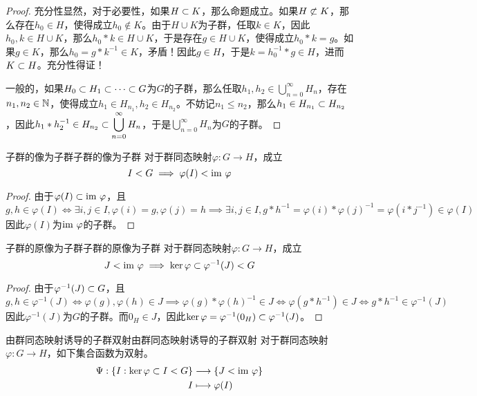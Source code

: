 \begin{proof}
	充分性显然，对于必要性，如果$H\subset K$，那么命题成立。如果$H\not\subset K$，那么存在$h_0\in H$，使得成立$h_0\notin K$。由于$H\cup K$为子群，任取$k\in K$，因此$h_0,k\in H\cup K$，那么$h_0*k\in H\cup K$，于是存在$g\in H\cup K$，使得成立$h_0*k=g$。如果$g\in K$，那么$h_0=g*k^{-1}\in K$，矛盾！因此$g\in H$，于是$k=h_0^{-1}*g\in H$，进而$K\subset H$。充分性得证！
	
	一般的，如果$H_0\subset H_1\subset\cdots\subset G$为$G$的子群，那么任取$h_1,h_2\in \displaystyle\bigcup_{n=0}^{\infty}H_n$，存在$n_1,n_2\in\mathbb{N}$，使得成立$h_1\in H_{n_1},h_2\in H_{n_2}$。不妨记$n_1\le n_2$，那么$h_1\in H_{n_1}\subset H_{n_2}$，因此$h_1*h_2^{-1}\in H_{n_2}\subset\displaystyle\bigcup_{n=0}^{\infty}H_n$，于是$\displaystyle\bigcup_{n=0}^{\infty}H_n$为$G$的子群。
\end{proof}

\begin{proposition}{子群的像为子群}{子群的像为子群}
	对于群同态映射$\varphi:G\to H$，成立
	$$
	I<G\implies \varphi(I)<\text{im } \varphi
	$$
\end{proposition}

\begin{proof}
	由于$\varphi(I)\subset\text{im } \varphi$，且
	$$
	g,h\in \varphi(I)
	\iff \exists i,j\in I,\varphi(i)=g,\varphi(j)=h
	\implies \exists i,j\in I,g*h^{-1}=\varphi(i)*\varphi(j)^{-1}=\varphi(i*j^{-1})\in \varphi(I)
	$$
	因此$\varphi(I)$为$\text{im } \varphi$的子群。
\end{proof}

\begin{proposition}{子群的原像为子群}{子群的原像为子群}
	对于群同态映射$\varphi:G\to H$，成立
	$$
	J<\text{im } \varphi\implies \ker\varphi\subset \varphi^{-1}(J)<G
	$$
\end{proposition}

\begin{proof}
	由于$\varphi^{-1}(J)\subset G$，且
	$$
	g,h\in \varphi^{-1}(J)
	\iff \varphi(g),\varphi(h)\in J
	\implies \varphi(g)*\varphi(h)^{-1}\in J
	\iff \varphi(g*h^{-1})\in J
	\iff g*h^{-1} \in \varphi^{-1}(J)
	$$
	因此$\varphi^{-1}(J)$为$G$的子群。而$0_H\in J$，因此$\ker\varphi=\varphi^{-1}(0_H)\subset \varphi^{-1}(J)$。
\end{proof}

\begin{proposition}{由群同态映射诱导的子群双射}{由群同态映射诱导的子群双射}
	对于群同态映射$\varphi:G\to H$，如下集合函数为双射。
	\begin{align*}
		\Psi:\begin{aligned}[t]
			\{ I:\ker\varphi\subset I<G \}&\longrightarrow \{ J<\text{im } \varphi \}\\
			I&\longmapsto \varphi(I)
		\end{aligned}
	\end{align*}
\end{proposition}

